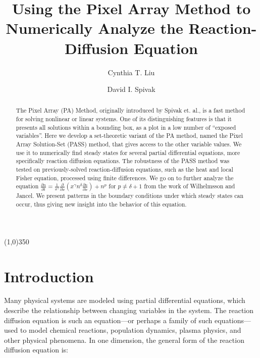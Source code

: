 \documentclass[11pt]{article}
\begin{document}
\title{Using the Pixel Array Method to\\Numerically Analyze the Reaction-Diffusion Equation}
\author[1]{Cynthia T. Liu}
\author[2]{David I. Spivak}
\date{}

\maketitle

\begin{abstract}
The Pixel Array (PA) Method, originally introduced by Spivak et. al., is a fast method for solving nonlinear or linear systems. One of its distinguishing features is that it presents all solutions within a bounding box, as a plot in a low number of ``exposed variables''. Here we develop a set-theoretic variant of the PA method, named the Pixel Array Solution-Set (PASS) method, that gives access to the other variable values. We use it to numerically find steady states for several partial differential equations, more specifically reaction diffusion equations. The robustness of the PASS method was tested on previously-solved reaction-diffusion equations, such as the heat and local Fisher equation, processed using finite differences. We go on to further analyze the equation
$\frac{\partial{n}}{\partial{t}} = \frac{1}{x^\gamma} \frac{\partial}{\partial{x}}\left(x^\gamma n^\delta \frac{\partial{n}}{\partial{x}} \right) + n^p$
for $p \ne \delta + 1$ from the work of Wilhelmsson and Jancel. We present patterns in the boundary conditions under which steady states can occur, thus giving new insight into the behavior of this equation.
\end{abstract}

\begin{center}
\line(1,0){350}
\end{center}

\section{Introduction}

Many physical systems are modeled using partial differential equations, which describe the relationship between changing variables in the system. The reaction diffusion equation is such an equation---or perhaps a family of such equations---used to model chemical reactions, population dynamics, plasma physics, and other physical phenomena. In one dimension, the general form of the reaction diffusion equation is:
\end{document}
